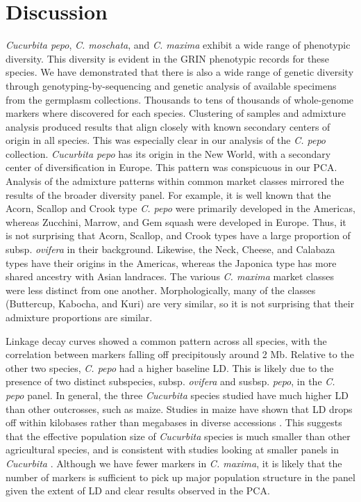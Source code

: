 \documentclass[utf8]{FrontiersinHarvard} %
\begin{document}
\section{Discussion}
\textit{Cucurbita pepo}, \textit{C. moschata}, and \textit{C. maxima} exhibit a wide range of phenotypic diversity. This diversity is evident in the GRIN phenotypic records for these species. We have demonstrated that there is also a wide range of genetic diversity through genotyping-by-sequencing and genetic analysis of available specimens from the germplasm collections. Thousands to tens of thousands of whole-genome markers where discovered for each species. Clustering of samples and admixture analysis produced results that align closely with known secondary centers of origin in all species. This was especially clear in our analysis of the \textit{C. pepo} collection. \textit{Cucurbita pepo} has its origin in the New World, with a secondary center of diversification in Europe. This pattern was conspicuous in our PCA. Analysis of the admixture patterns within common market classes mirrored the results of the broader diversity panel. For example, it is well known that the Acorn, Scallop and Crook type \textit{C. pepo} were primarily developed in the Americas, whereas Zucchini, Marrow, and Gem squash were developed in Europe. Thus, it is not surprising that Acorn, Scallop, and Crook types have a large proportion of subsp. \textit{ovifera} in their background. Likewise, the Neck, Cheese, and Calabaza types have their origins in the Americas, whereas the Japonica type has more shared ancestry with Asian landraces. The various \textit{C. maxima} market classes were less distinct from one another. Morphologically, many of the classes (Buttercup, Kabocha, and Kuri) are very similar, so it is not surprising that their admixture proportions are similar. 

Linkage decay curves showed a common pattern across all species, with the correlation between markers falling off precipitously around 2 Mb. Relative to the other two species, \textit{C. pepo} had a higher baseline LD. This is likely due to the presence of two distinct subspecies, subsp. \textit{ovifera} and susbsp. \textit{pepo}, in the \textit{C. pepo} panel. In general, the three \textit{Cucurbita} species studied have much higher LD than other outcrosses, such as maize. Studies in maize have shown that LD drops off within kilobases rather than megabases in diverse accessions \citep{Yan2009}. This suggests that the effective population size of \textit{Cucurbita} species is much smaller than other agricultural species, and is consistent with studies looking at smaller panels in \textit{Cucurbita} \citep{Xanthopoulou2019}. Although we have fewer markers in \textit{C. maxima}, it is likely that the number of markers is sufficient to pick up major population structure in the panel given the extent of LD and clear results observed in the PCA.
\end{document}
